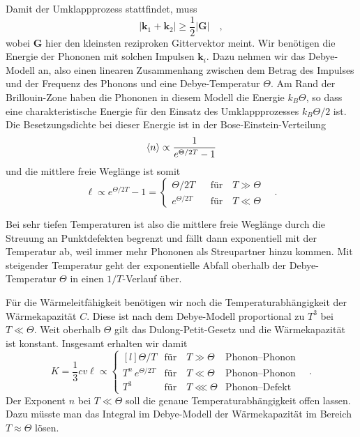 Damit der Umklappprozess stattfindet, muss
\begin{equation}
    | \mathbf{k}_1 +  \mathbf{k}_2| \ge \frac{1}{2} | \mathbf{G} | \quad ,
\end{equation}
wobei $\mathbf{G}$ hier den kleinsten reziproken Gittervektor meint. Wir benötigen die Energie der Phononen mit solchen Impulsen $\mathbf{k}_i$. Dazu nehmen wir das Debye-Modell an, also einen linearen Zusammenhang zwischen dem Betrag des Impulses und der Frequenz des Phonons und eine Debye-Temperatur $\Theta$.  Am Rand der Brillouin-Zone haben die Phononen in diesem Modell die Energie $k_B \Theta$, so dass eine charakteristische Energie für den Einsatz des Umklappprozesses $k_B \Theta / 2$ ist. Die Besetzungsdichte bei dieser Energie ist in der Bose-Einstein-Verteilung
\begin{equation}
    \braket{n} \propto \frac{1}{e^{\Theta / 2T} -1}
\end{equation}
und die mittlere freie Weglänge ist somit
\begin{equation}
    \ell \propto e^{\Theta / 2T} -1 = 
    \left\{
    \begin{matrix*}
        \Theta / 2 T             & \text{für} \quad T \gg \Theta  \\     
        e^{\Theta / 2T} \quad & \text{für} \quad T \ll \Theta 
    \end{matrix*}
    \right. \quad .
\end{equation}

Bei sehr tiefen Temperaturen ist also die mittlere freie Weglänge durch die Streuung an Punktdefekten begrenzt und fällt dann exponentiell mit der Temperatur ab, weil immer mehr Phononen als Streupartner hinzu kommen. Mit steigender Temperatur geht der exponentielle Abfall oberhalb der Debye-Temperatur $\Theta$ in einen $1/T$-Verlauf über.


Für die Wärmeleitfähigkeit benötigen wir noch die Temperaturabhängigkeit der Wärmekapazität $C$. Diese ist nach dem Debye-Modell proportional zu $T^3$ bei $T \ll \Theta$. Weit oberhalb $\Theta$ gilt das Dulong-Petit-Gesetz und die Wärmekapazität ist konstant. Insgesamt erhalten wir damit 
\begin{equation}
    K = \frac{1}{3} c v \ell  \propto 
    \left\{
    \begin{matrix*}[l]
        \Theta / T                    & \text{für} \quad T \gg \Theta    & \text{Phonon--Phonon}      \\
      T^n \,  e^{\Theta / 2T}        & \text{für} \quad T \ll \Theta    & \text{Phonon--Phonon}      \\
      T^3                            & \text{für} \quad T \lll \Theta   & \text{Phonon--Defekt}     
    \end{matrix*}
    \right. \quad .
\end{equation}
Der Exponent $n$ bei $ T \ll \Theta  $ soll die genaue Temperaturabhängigkeit offen lassen. Dazu müsste man das Integral im Debye-Modell der Wärmekapazität im Bereich $T \approx \Theta$ lösen. 

